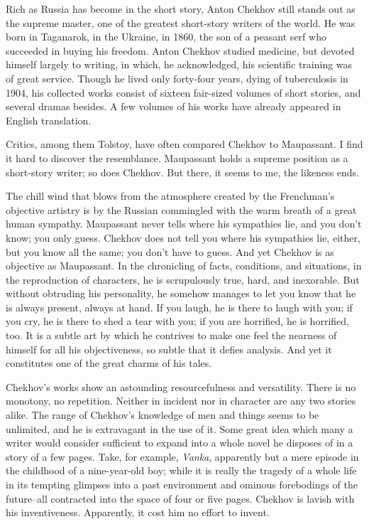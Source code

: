 Rich as Russia has become in the short story, Anton Chekhov still
stands out as the supreme master, one of the greatest short-story
writers of the world. He was born in Taganarok, in the Ukraine, in
1860, the son of a peasant serf who succeeded in buying his freedom.
Anton Chekhov studied medicine, but devoted himself largely to
writing, in which, he acknowledged, his scientific training was of
great service. Though he lived only forty-four years, dying of
tuberculosis in 1904, his collected works consist of sixteen
fair-sized volumes of short stories, and several dramas besides. A few
volumes of his works have already appeared in English translation.

Critics, among them Tolstoy, have often compared Chekhov to
Maupassant. I find it hard to discover the resemblance. Maupassant
holds a supreme position as a short-story writer; so does Chekhov. But
there, it seems to me, the likeness ends.

The chill wind that blows from the atmosphere created by the
Frenchman's objective artistry is by the Russian commingled with the
warm breath of a great human sympathy. Maupassant never tells where
his sympathies lie, and you don't know; you only guess. Chekhov does
not tell you where his sympathies lie, either, but you know all the
same; you don't have to guess. And yet Chekhov is as objective as
Maupassant. In the chronicling of facts, conditions, and situations,
in the reproduction of characters, he is scrupulously true, hard, and
inexorable. But without obtruding his personality, he somehow manages
to let you know that he is always present, always at hand. If you
laugh, he is there to laugh with you; if you cry, he is there to shed
a tear with you; if you are horrified, he is horrified, too. It is a
subtle art by which he contrives to make one feel the nearness of
himself for all his objectiveness, so subtle that it defies analysis.
And yet it constitutes one of the great charms of his tales.

Chekhov's works show an astounding resourcefulness and versatility.
There is no monotony, no repetition. Neither in incident nor in
character are any two stories alike. The range of Chekhov's knowledge
of men and things seems to be unlimited, and he is extravagant in the
use of it. Some great idea which many a writer would consider
sufficient to expand into a whole novel he disposes of in a story of a
few pages. Take, for example, \emph{Vanka}, apparently but a mere episode
in the childhood of a nine-year-old boy; while it is really the
tragedy of a whole life in its tempting glimpses into a past
environment and ominous forebodings of the future--all contracted into
the space of four or five pages. Chekhov is lavish with his
inventiveness. Apparently, it cost him no effort to invent.

